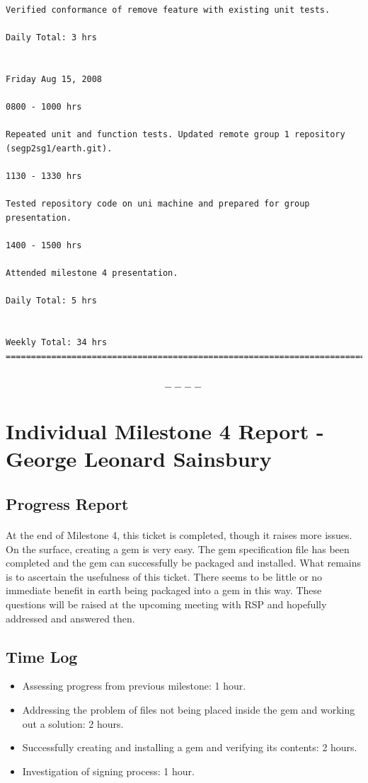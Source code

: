 \documentclass[10pt,a4,oneside]{article}
\begin{document}
\begin{mylisting}
\begin{verbatim}
Verified conformance of remove feature with existing unit tests.

Daily Total: 3 hrs


Friday Aug 15, 2008

0800 - 1000 hrs

Repeated unit and function tests. Updated remote group 1 repository (segp2sg1/earth.git).

1130 - 1330 hrs

Tested repository code on uni machine and prepared for group presentation.

1400 - 1500 hrs

Attended milestone 4 presentation.

Daily Total: 5 hrs


Weekly Total: 34 hrs
========================================================================


\end{verbatim}
\end{mylisting}

\[----\]

\newpage

\section{Individual Milestone 4 Report - George Leonard Sainsbury}

\subsection*{Progress Report}

\paragraph{}
At the end of Milestone 4, this ticket is completed, though it raises more issues. On the surface, creating a gem is very easy. The gem specification file has been completed and the gem can successfully be packaged and installed. What remains is to ascertain the usefulness of this ticket. There seems to be little or no immediate benefit in earth being packaged into a gem in this way. These questions will be raised at the upcoming meeting with RSP and  hopefully addressed and answered then.

\subsection*{Time Log}
\begin{itemize}
 \item Assessing progress from previous milestone: 1 hour.
 \item Addressing the problem of files not being placed inside the  
gem and working out a solution: 2 hours.
 \item Successfully creating and installing a gem and verifying its  
contents: 2 hours.
 \item Investigation of signing process: 1 hour.
\end{itemize}
\end{document}

